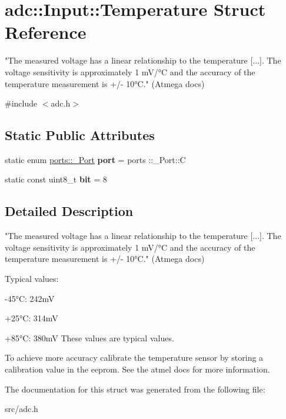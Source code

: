 \hypertarget{structadc_1_1Input_1_1Temperature}{}\section{adc\+:\+:Input\+:\+:Temperature Struct Reference}
\label{structadc_1_1Input_1_1Temperature}


"The measured voltage has a linear relationship to the temperature \mbox{[}...\mbox{]}. The voltage sensitivity is approximately 1 m\+V/°C and the accuracy of the temperature measurement is +/-\/ 10°C." (Atmega docs)  




{\ttfamily \#include $<$adc.\+h$>$}

\subsection*{Static Public Attributes}
\begin{DoxyCompactItemize}
\item 
static enum \hyperlink{namespaceports_a9949317f344930bd6ad1097e80c97b67}{ports\+::\+\_\+\+Port} {\bfseries port} = ports \+::\+\_\+\+Port\+::C\hypertarget{structadc_1_1Input_1_1Temperature_ac012a086a736256fccb6c33396289890}{}\label{structadc_1_1Input_1_1Temperature_ac012a086a736256fccb6c33396289890}

\item 
static const uint8\+\_\+t {\bfseries bit} = 8\hypertarget{structadc_1_1Input_1_1Temperature_aebcf8f7325e61063e68ffb71788054b9}{}\label{structadc_1_1Input_1_1Temperature_aebcf8f7325e61063e68ffb71788054b9}

\end{DoxyCompactItemize}


\subsection{Detailed Description}
"The measured voltage has a linear relationship to the temperature \mbox{[}...\mbox{]}. The voltage sensitivity is approximately 1 m\+V/°C and the accuracy of the temperature measurement is +/-\/ 10°C." (Atmega docs) 

Typical values\+:
\begin{DoxyItemize}
\item -\/45°C\+: 242mV
\item +25°C\+: 314mV
\item +85°C\+: 380mV These values are typical values.
\end{DoxyItemize}

To achieve more accuracy calibrate the temperature sensor by storing a calibration value in the eeprom. See the atmel docs for more information. 

The documentation for this struct was generated from the following file\+:\begin{DoxyCompactItemize}
\item 
src/adc.\+h\end{DoxyCompactItemize}
